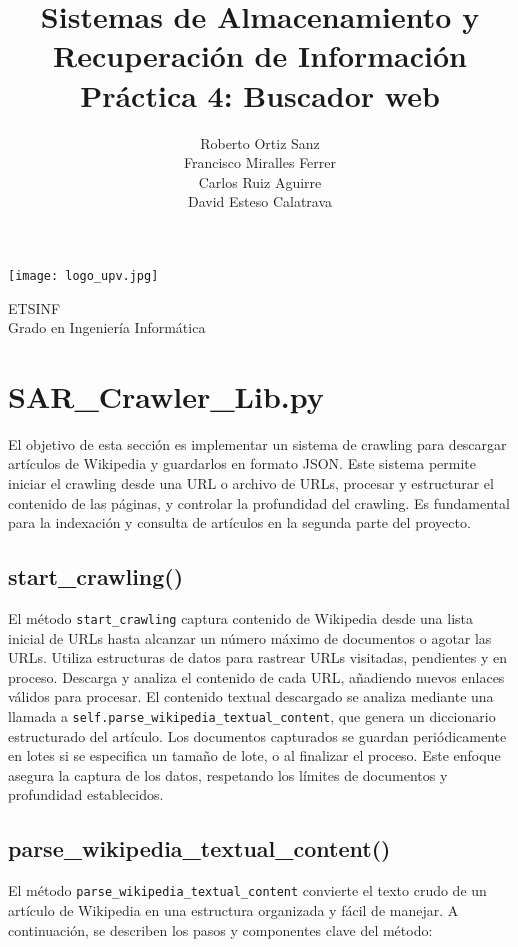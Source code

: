 \documentclass[12pt,a4paper]{article}
\title{\textbf{Sistemas de Almacenamiento y\\ Recuperación de Información\\Práctica 4: Buscador web}}
\author{
  Roberto Ortiz Sanz \\ 
  Francisco Miralles Ferrer \\ 
  Carlos Ruiz Aguirre \\ 
  David Esteso Calatrava
}
\begin{document}
\begin{titlepage}
\maketitle
\begin{center}

\vspace{10mm}

\texttt{[image: logo\_upv.jpg]}

\vfill

\large
ETSINF\\
Grado en Ingeniería Informática
\end{center}
\end{titlepage}

\tableofcontents

\newpage

\section{SAR\_Crawler\_Lib.py}

El objetivo de esta sección es implementar un sistema de crawling para descargar artículos de Wikipedia y guardarlos en formato JSON. Este sistema permite iniciar el crawling desde una URL o archivo de URLs, procesar y estructurar el contenido de las páginas, y controlar la profundidad del crawling. Es fundamental para la indexación y consulta de artículos en la segunda parte del proyecto.

\subsection{start\_crawling()}
El método \texttt{start\_crawling} captura contenido de Wikipedia desde una lista inicial de URLs hasta alcanzar un número máximo de documentos o agotar las URLs. Utiliza estructuras de datos para rastrear URLs visitadas, pendientes y en proceso. Descarga y analiza el contenido de cada URL, añadiendo nuevos enlaces válidos para procesar. El contenido textual descargado se analiza mediante una llamada a \texttt{self.parse\_wikipedia\_textual\_content}, que genera un diccionario estructurado del artículo. Los documentos capturados se guardan periódicamente en lotes si se especifica un tamaño de lote, o al finalizar el proceso. Este enfoque asegura la captura de los datos, respetando los límites de documentos y profundidad establecidos.

\subsection{parse\_wikipedia\_textual\_content()}
El método \texttt{parse\_wikipedia\_textual\_content} convierte el texto crudo de un artículo de Wikipedia en una estructura organizada y fácil de manejar. A continuación, se describen los pasos y componentes clave del método:
\end{document}
